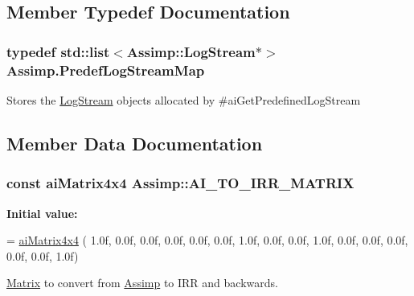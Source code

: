 \subsection{Member Typedef Documentation}
\hypertarget{class_assimp_af711f465b88b72eeaaa5456ee8b42363}{
\subsubsection[{Predef\+Log\+Stream\+Map}]{\setlength{\rightskip}{0pt plus 5cm}typedef std\+::list$<${\bf Assimp\+::\+Log\+Stream}$\ast$$>$ Assimp.\+Predef\+Log\+Stream\+Map}}\label{class_assimp_af711f465b88b72eeaaa5456ee8b42363}
Stores the \hyperlink{class_assimp_1_1_log_stream}{Log\+Stream} objects allocated by \#ai\+Get\+Predefined\+Log\+Stream 

\subsection{Member Data Documentation}
\hypertarget{class_assimp_a19314eac9c9ac4063428dc825776156c}{
\subsubsection[{A\+I\+\_\+\+T\+O\+\_\+\+I\+R\+R\+\_\+\+M\+A\+T\+R\+I\+X}]{\setlength{\rightskip}{0pt plus 5cm}const {\bf ai\+Matrix4x4} Assimp\+::\+A\+I\+\_\+\+T\+O\+\_\+\+I\+R\+R\+\_\+\+M\+A\+T\+R\+I\+X}}\label{class_assimp_a19314eac9c9ac4063428dc825776156c}
{\bfseries Initial value\+:}
\begin{DoxyCode}
= \hyperlink{structai_matrix4x4}{aiMatrix4x4} ( 
    1.0f, 0.0f, 0.0f, 0.0f, 
    0.0f, 0.0f, 1.0f, 0.0f,
    0.0f, 1.0f, 0.0f, 0.0f, 
    0.0f, 0.0f, 0.0f, 1.0f)
\end{DoxyCode}


\hyperlink{class_matrix}{Matrix} to convert from \hyperlink{class_assimp}{Assimp} to I\+R\+R and backwards. 

